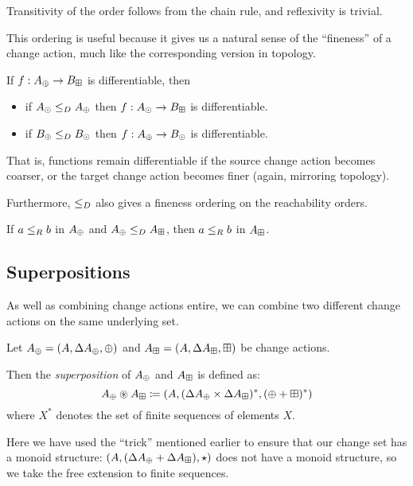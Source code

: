 Transitivity of the order follows from the chain rule, and reflexivity is trivial.

This ordering is useful because it gives us a natural sense of the ``fineness''
of a change action, much like the corresponding version in topology.

\begin{prop}
  If $f: A_\oplus \rightarrow B_\boxplus$ is differentiable, then
  \begin{itemize}
    \item if $A_\odot \leq_D A_\oplus$ then $f: A_\odot \rightarrow
      B_\boxplus$ is differentiable.
    \item if $B_\oplus \leq_D B_\odot$ then $f: A_\oplus \rightarrow
      B_\odot$ is differentiable.
  \end{itemize}
\end{prop}

That is, functions remain differentiable if the source change action becomes
coarser, or the target change action becomes finer (again, mirroring topology).

Furthermore, $\leq_D$ also gives a fineness ordering on the reachability orders.

\begin{prop}
  If $a \leq_R b$ in $A_\oplus$ and $A_\oplus \leq_D A_\boxplus$, then $a \leq_R b$ in $A_\boxplus$.
\end{prop}

\subsection{Superpositions}

As well as combining change actions entire, we can combine two different
change actions on the same underlying set.

\begin{defn}[Superposition]
  Let $A_\oplus = (A,\Delta A_\oplus,\oplus)$ and $A_\boxplus =
  (A,\Delta A_\boxplus,\boxplus)$ be change actions.

  Then the \textit{superposition} of $A_\oplus$ and $A_\boxplus$ is defined as:
  $$A_\oplus \circledast A_\boxplus \coloneqq (A,
    (\Delta A_\oplus \times \Delta A_\boxplus)^\ast,(\oplus + \boxplus)^\ast)$$
  where $X^\ast$ denotes the set of finite sequences of elements $X$.
\end{defn}

Here we have used the ``trick'' mentioned earlier to ensure that our change
set has a monoid structure: $(A,(\Delta A_\oplus +
  \Delta A_\boxplus),\star)$ does not have a monoid structure, so we take
the free extension to finite sequences.

